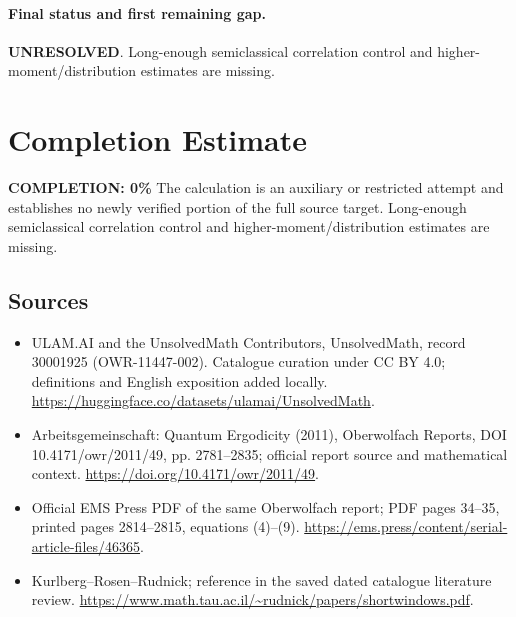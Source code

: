 \documentclass[11pt]{article}
\begin{document}
\paragraph{Final status and first remaining gap.}
\textbf{UNRESOLVED}. Long-enough semiclassical correlation control and higher-moment/distribution estimates are missing.

\section{Completion Estimate}
\noindent\textbf{COMPLETION: 0\%}
The calculation is an auxiliary or restricted attempt and establishes no newly verified portion of the full source target. Long-enough semiclassical correlation control and higher-moment/distribution estimates are missing.

\subsection{Sources}
\begin{itemize}
\item[\hypertarget{source:30001925:1}{S1}] ULAM.AI and the UnsolvedMath Contributors, UnsolvedMath, record 30001925 (OWR-11447-002). Catalogue curation under CC BY 4.0; definitions and English exposition added locally.
\url{https://huggingface.co/datasets/ulamai/UnsolvedMath}.
\item[\hypertarget{source:30001925:2}{S2}] Arbeitsgemeinschaft: Quantum Ergodicity (2011), Oberwolfach Reports, DOI 10.4171/owr/2011/49, pp. 2781--2835; official report source and mathematical context.
\url{https://doi.org/10.4171/owr/2011/49}.
\item[\hypertarget{source:30001925:3}{S3}] Official EMS Press PDF of the same Oberwolfach report; PDF pages 34--35, printed pages 2814--2815, equations (4)--(9).
\url{https://ems.press/content/serial-article-files/46365}.
\item[\hypertarget{source:30001925:4}{S4}] Kurlberg--Rosen--Rudnick; reference in the saved dated catalogue literature review.
\url{https://www.math.tau.ac.il/~rudnick/papers/shortwindows.pdf}.
\end{itemize}
\label{end:30001925}
\end{document}

